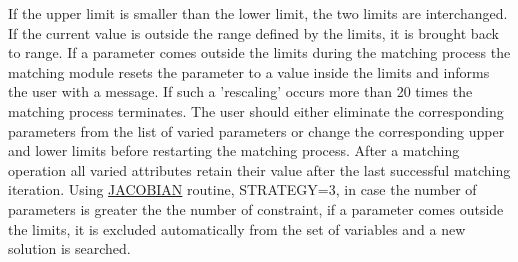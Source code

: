 If the upper limit is smaller than the lower limit, the two limits are
interchanged. If the current value is outside the range defined by the
limits, it is brought back to range. If a parameter comes outside the
limits during the matching process the matching module resets the
parameter to a value inside the limits and informs the user with a
message. If such a 'rescaling' occurs more than 20 times the matching
process terminates. The user should either eliminate the corresponding
parameters from the list of varied parameters or change the
corresponding upper and lower limits before restarting the matching
process. After a matching operation all varied attributes retain their
value after the last successful matching iteration. Using
\href{match_xeq.html#jacobian}{JACOBIAN} routine, STRATEGY=3, in case
the number of parameters is greater the the number of constraint, if a
parameter comes outside the limits, it is excluded automatically from
the set of variables and a new solution is searched.  

